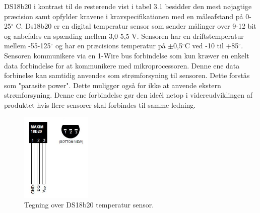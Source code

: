 DS18b20 i kontrast til de resterende vist i tabel 3.1 besidder den mest nøjagtige præcision samt opfylder kravene i kravspecifikationen med en måleafstand på 0-25$^{\circ}$ C. \newline
Ds18b20 er en digital temperatur sensor som sender målinger over 9-12 bit og anbefales en spænding mellem 3,0-5,5 V. \newline
Sensoren har en driftstemperatur mellem -55-125$^{\circ}$ og har en præcisions temperatur på $\pm$0,5$^{\circ}$C ved -10 til +85$^{\circ}$. Sensoren kommunikere via en 1-Wire bus forbindelse som kun kræver en enkelt data forbindelse for at kommunikere med mikroprocessoren. Denne ene data forbinelse kan samtidig anvendes som strømforsyning til sensoren. Dette forstås som "parasite power". Dette muliggør også for ikke at anvende ekstern strømforsyning. 
Denne ene forbindelse gør den ideél netop i videreudviklingen af produktet hvis flere sensorer skal forbindes til samme ledning.

\begin{figure}[h!]
  \centering
  \includegraphics[width=0.3\textwidth]{figures/ds18b20-pinout.jpg}
  \caption{Tegning over DS18b20 temperatur sensor.}
  \label{tempgraf_eksempel1}
\end{figure} 


   






\newpage
